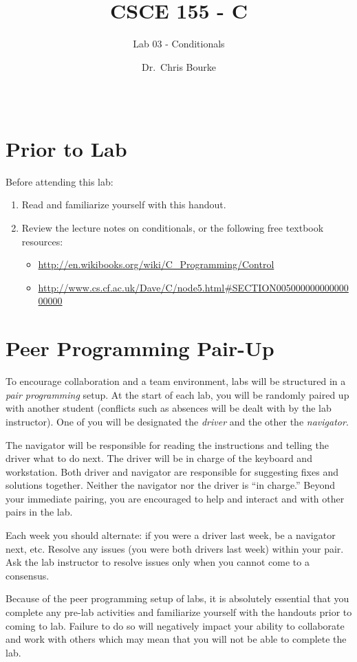 \documentclass[12pt]{scrartcl}
\title{CSCE 155 - C}
\subtitle{Lab 03 - Conditionals}
\author{Dr.\ Chris Bourke}
\date{~}
\begin{document}
\maketitle

\section*{Prior to Lab}

Before attending this lab:
\begin{enumerate}
  \item Read and familiarize yourself with this handout.
  \item Review the lecture notes on conditionals, or the following free textbook resources:
	\begin{itemize}
  	  \item \url{http://en.wikibooks.org/wiki/C_Programming/Control}
	  \item \url{http://www.cs.cf.ac.uk/Dave/C/node5.html#SECTION00500000000000000000}
	\end{itemize}
\end{enumerate}

\section*{Peer Programming Pair-Up}

To encourage collaboration and a team environment, labs will be
structured in a \emph{pair programming} setup.  At the start of
each lab, you will be randomly paired up with another student 
(conflicts such as absences will be dealt with by the lab instructor).
One of you will be designated the \emph{driver} and the other
the \emph{navigator}.  

The navigator will be responsible for reading the instructions and
telling the driver what to do next.  The driver will be in charge of the
keyboard and workstation.  Both driver and navigator are responsible
for suggesting fixes and solutions together.  Neither the navigator
nor the driver is ``in charge.''  Beyond your immediate pairing, you
are encouraged to help and interact and with other pairs in the lab.

Each week you should alternate: if you were a driver last week, 
be a navigator next, etc.  Resolve any issues (you were both drivers
last week) within your pair.  Ask the lab instructor to resolve issues
only when you cannot come to a consensus.  

Because of the peer programming setup of labs, it is absolutely 
essential that you complete any pre-lab activities and familiarize
yourself with the handouts prior to coming to lab.  Failure to do
so will negatively impact your ability to collaborate and work with 
others which may mean that you will not be able to complete the
lab.  
\end{document}
